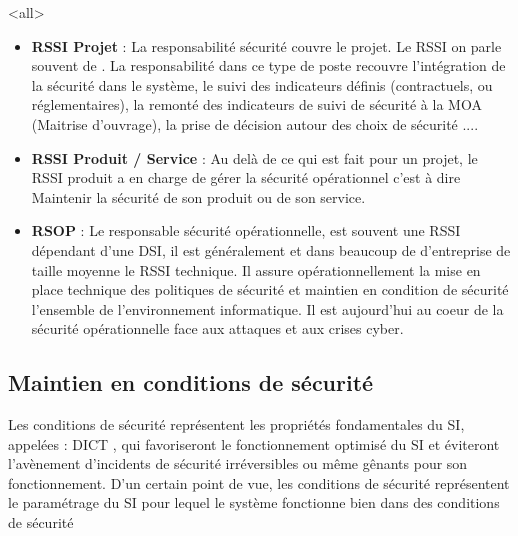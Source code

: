\mode<all>{
{\begin{itemize}
	\item \textbf{RSSI Projet} : La responsabilité sécurité couvre le projet. Le RSSI on parle souvent de . La responsabilité dans ce type de poste recouvre l'intégration de la sécurité dans le système, le suivi des indicateurs définis (contractuels, ou réglementaires), la remonté des indicateurs de suivi de sécurité à la MOA (Maitrise d'ouvrage), la prise de décision autour des choix de sécurité ....
	\item \textbf{RSSI Produit / Service} : Au delà de ce qui est fait pour un projet, le RSSI produit a en charge de gérer la sécurité opérationnel c'est à dire Maintenir la sécurité de son produit ou de son service.
 \item \textbf{RSOP} : Le responsable sécurité opérationnelle, est souvent une RSSI dépendant d'une DSI, il est généralement et dans beaucoup de d'entreprise de taille moyenne le RSSI technique. Il assure opérationnellement la mise en place technique des politiques de sécurité et maintien en condition de sécurité l'ensemble de l'environnement informatique. Il est aujourd'hui au coeur de la sécurité opérationnelle face aux attaques et aux crises cyber.
\end{itemize}
}} %


\subsection{Maintien en conditions de sécurité}

Les conditions de sécurité représentent les propriétés fondamentales du SI, appelées : \gls{DICT} , qui favoriseront le fonctionnement optimisé du SI et éviteront l'avènement d'incidents de sécurité irréversibles ou même gênants pour son fonctionnement. D'un certain point de vue, les conditions de sécurité représentent le paramétrage du SI pour lequel le système fonctionne bien dans des conditions de sécurité 

